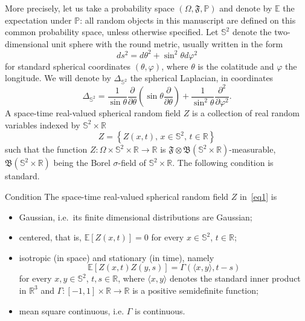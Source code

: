 \documentclass[AHL,Unicode,longabstracts,published]{cedram}
\newcommand{\bbS}{\mathbb{S}}
\newcommand{\bbR}{\mathbb{R}}
\newcommand{\bbP}{\mathbb{P}}
\newcommand{\bbE}{\mathbb{E}}
\newcommand{\fkF}{\mathfrak{F}}
\newcommand{\fkB}{\mathfrak{B}}
\begin{document}
More precisely, let us take a probability space $(\Omega,\fkF,
\bbP)$ and denote by $\bbE$ the expectation under $\bbP$: all random objects in this manuscript are defined on this common probability space, unless otherwise specified. Let $\bbS^{2}$ denote the two-dimensional unit sphere with the round metric, usually written in the form
\begin{equation*}
ds^{2}=d\theta ^{2}+\sin ^{2}\theta d\varphi ^{2}
\end{equation*}
for standard spherical coordinates $(\theta,\varphi)$, where $\theta $ is the colatitude and $\varphi $ the longitude. We will denote by $\Delta_{\bbS^2}$ the spherical Laplacian, in coordinates
\begin{equation*}
\Delta_{\bbS^2} = \frac{1}{\sin \theta} \frac{\partial}{\partial \theta} \left (\sin
\theta \frac{\partial}{\partial \theta} \right) + \frac{1}{\sin^2\theta}
\frac{\partial^2}{\partial \varphi^2}.
\end{equation*}
A space-time real-valued spherical random field $Z$ is a collection of real random variables indexed by $\bbS^{2}\times \bbR$
\begin{equation}\label{eq1}
Z=\left\{Z(x,t),\,x\in \bbS^{2},\,t\in \bbR\right\}
\end{equation}
such that the function $Z:\Omega \times \bbS^{2}\times \bbR
\rightarrow \bbR$ is $\fkF\otimes \fkB(\bbS ^{2}\times \bbR)$-measurable, $\fkB(\bbS^{2}\times\bbR)$ being the Borel $\sigma $-field of $\bbS^{2}\times
\bbR$. The following condition is standard.

\begin{enonce}{Condition}\label{basic}
The space-time real-valued spherical random field $Z$ in~\eqref{eq1} is
\begin{itemize}
\item Gaussian, i.e.~its finite dimensional distributions are Gaussian;

\item centered, that is, $\bbE[Z(x,t)] = 0$ for every $x\in \bbS ^2$, $t\in \bbR$;

\item isotropic (in space) and stationary (in time), namely
\begin{equation}\label{Gamma}
\bbE[Z(x,t) Z(y,s)] = \Gamma(\langle x,y\rangle, t-s)
\end{equation}
for every $x,y\in \bbS^2$, $t,s \in \bbR$, where $\langle x, y\rangle$ denotes the standard inner product in $\bbR^3$ and $
\Gamma:[-1,1]\times \bbR\to \bbR$ is a positive semidefinite function;

\item mean square continuous, i.e. $\Gamma$ is continuous.
\end{itemize}
\end{enonce}
\end{document}
